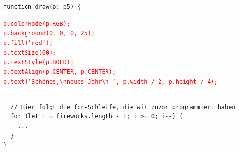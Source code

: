 \documentclass{article}
\begin{document}
    \begin{tcolorbox}[colback=gray!30, colframe=white]
        \begin{verbatim}
function draw(p: p5) { \end{verbatim}
        \vspace{-0.4cm}
        \hspace{0.3cm}
        \texttt{\textcolor{red}{p.colorMode(p.RGB);}} \\
        \hspace{0.3cm}
        \texttt{\textcolor{red}{p.background(0, 0, 0, 25);}} \\
        
        \vspace{\baselineskip}
        \hspace{0.3cm}
        \texttt{\textcolor{red}{p.fill('red');}} \\
        \hspace{0.3cm}
        \texttt{\textcolor{red}{p.textSize(60);}} \\
        \hspace{0.3cm}
        \texttt{\textcolor{red}{p.textStyle(p.BOLD);}} \\
        \hspace{0.3cm}
        \texttt{\textcolor{red}{p.textAlign(p.CENTER, p.CENTER);}} \\
        \hspace{0.3cm}
        \texttt{\textcolor{red}{p.text('Schönes,\textbackslash nneues Jahr\textbackslash n \faGlassCheers \faCocktail \faBirthdayCake', p.width / 2, p.height / 4);}}
        \vspace{-0.4cm}
        \begin{verbatim}
       
  // Hier folgt die for-Schleife, die wir zuvor programmiert haben
  for (let i = fireworks.length - 1; i >= 0; i--) {
    ...
  }
}\end{verbatim}
    \end{tcolorbox}
    
\end{document}
